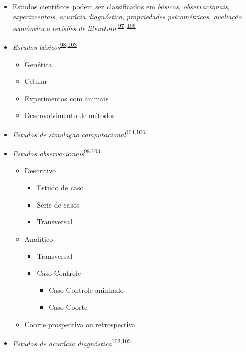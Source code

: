 \documentclass[
]{book}
\begin{document}
\begin{itemize}
\item
  Estudos científicos podem ser classificados em \emph{básicos}, \emph{observacionais}, \emph{experimentais}, \emph{acurácia diagnóstica}, \emph{propriedades psicométricas}, \emph{avaliação econômica} e \emph{revisões de literatura}:\textsuperscript{\protect\hyperlink{ref-Grant2009}{97}--\protect\hyperlink{ref-chipman2022}{106}}
\item
  \emph{Estudos básicos}\textsuperscript{\protect\hyperlink{ref-Suxfct2014}{98},\protect\hyperlink{ref-Chidambaram2019}{103}}

  \begin{itemize}
  \item
    Genética
  \item
    Celular
  \item
    Experimentos com animais
  \item
    Desenvolvimento de métodos
  \end{itemize}
\item
  \emph{Estudos de simulação computacional}\textsuperscript{\protect\hyperlink{ref-Erdemir2020}{104},\protect\hyperlink{ref-chipman2022}{106}}
\item
  \emph{Estudos observacionais}\textsuperscript{\protect\hyperlink{ref-Suxfct2014}{98},\protect\hyperlink{ref-Chidambaram2019}{103}}

  \begin{itemize}
  \item
    Descritivo

    \begin{itemize}
    \item
      Estudo de caso
    \item
      Série de casos
    \item
      Transversal
    \end{itemize}
  \item
    Analítico

    \begin{itemize}
    \item
      Transversal
    \item
      Caso-Controle

      \begin{itemize}
      \item
        Caso-Controle aninhado
      \item
        Caso-Coorte
      \end{itemize}
    \end{itemize}
  \item
    Coorte prospectiva ou retrospectiva
  \end{itemize}
\item
  \emph{Estudos de acurácia diagnóstica}\textsuperscript{\protect\hyperlink{ref-Chassuxe92019}{102},\protect\hyperlink{ref-Yang2021}{105}}


\end{itemize}
\end{document}
